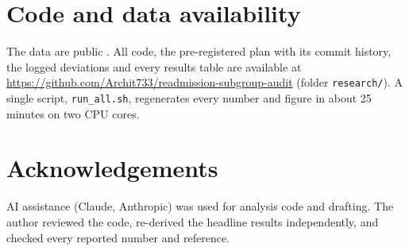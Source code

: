 \documentclass{article}
\begin{document}
\section*{Code and data availability}
The data are public \citep{uci2014}. All code, the pre-registered plan with its commit history, the logged deviations and every results table are available at \url{https://github.com/Archit733/readmission-subgroup-audit} (folder \texttt{research/}). A single script, \texttt{run\_all.sh}, regenerates every number and figure in about 25 minutes on two CPU cores.

\section*{Acknowledgements}
AI assistance (Claude, Anthropic) was used for analysis code and drafting. The author reviewed the code, re-derived the headline results independently, and checked every reported number and reference.



\end{document}
